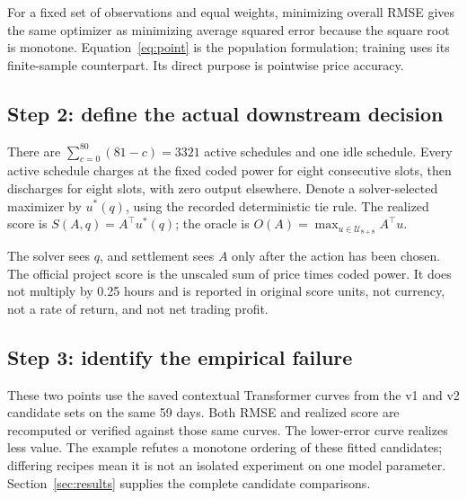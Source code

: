 \documentclass[11pt,a4paper]{article}
\begin{document}
For a fixed set of observations and equal weights, minimizing overall RMSE gives the same optimizer as minimizing average squared error because the square root is monotone. Equation~\eqref{eq:point} is the population formulation; training uses its finite-sample counterpart. Its direct purpose is pointwise price accuracy.

\subsection{Step 2: define the actual downstream decision}
\EqDispatch
There are $\sum_{c=0}^{80}(81-c)=3321$ active schedules and one idle schedule. Every active schedule charges at the fixed coded power for eight consecutive slots, then discharges for eight slots, with zero output elsewhere. Denote a solver-selected maximizer by $u^*(q)$, using the recorded deterministic tie rule. The realized score is $S(A,q)=A^\top u^*(q)$; the oracle is $O(A)=\max_{u\in\mathcal U_{8+8}}A^\top u$.

The solver sees $q$, and settlement sees $A$ only after the action has been chosen. The official project score is the unscaled sum of price times coded power. It does not multiply by 0.25 hours and is reported in original score units, not currency, not a rate of return, and not net trading profit.

\subsection{Step 3: identify the empirical failure}
\EqFailure
These two points use the saved contextual Transformer curves from the v1 and v2 candidate sets on the same 59 days. Both RMSE and realized score are recomputed or verified against those same curves. The lower-error curve realizes less value. The example refutes a monotone ordering of these fitted candidates; differing recipes mean it is not an isolated experiment on one model parameter. Section~\ref{sec:results} supplies the complete candidate comparisons.
\end{document}
